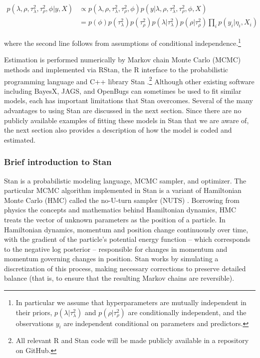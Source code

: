 \begin{align*}
p(\lambda, \rho, \tau^2_\lambda, \tau^2_\rho, \phi | y, X) & \propto p(\lambda, \rho, \tau^2_\lambda, \tau^2_\rho, \phi) p(y | \lambda, \rho, \tau^2_\lambda, \tau^2_\rho, \phi,  X)  \\
& = p(\phi) p(\tau^2_\lambda) p(\tau^2_\rho)  p(\lambda | \tau^2_\lambda) p(\rho | \tau^2_\rho) \prod_i p(y_i | \eta_i, X_i) 
\end{align*}

\noindent where the second line follows from assumptions of conditional independence.\footnote{In particular we assume that hyperparameters are mutually independent in their priors, $p(\lambda | \tau^2_\lambda)$ and $p(\rho | \tau^2_\rho)$ are conditionally independent, and the observations $y_i$ are independent conditional on parameters and predictors.}

Estimation is performed numerically by Markov chain Monte Carlo (MCMC) methods and implemented via RStan, the R interface to the probabilistic programming language and C++ library Stan .\footnote{All relevant R and Stan code will be made publicly available in a repository on GitHub.} Although other existing software including BayesX, JAGS, and OpenBugs can sometimes be used to fit similar models, each has important limitations that Stan overcomes. Several of the many advantages to using Stan are discussed in the next section. Since there are no publicly available examples of fitting these models in Stan that we are aware of, the next section also provides a description of how the model is coded and estimated. 

\subsubsection{Brief introduction to Stan}

Stan is a probabilistic modeling language, MCMC sampler, and optimizer. The particular MCMC algorithm implemented in Stan is a variant of Hamiltonian Monte Carlo (HMC) called the no-U-turn sampler (NUTS) . Borrowing from physics the concepts and mathematics behind Hamiltonian dynamics, HMC treats the vector of unknown parameters as the position of a particle. In Hamiltonian dynamics, momentum and position change continuously over time, with the gradient of the particle's potential energy function --  which corresponds to the negative log posterior -- responsible for changes in momentum and momentum governing changes in position. Stan works by simulating a discretization of this process, making necessary corrections to preserve detailed balance (that is, to ensure that the resulting Markov chains are reversible). 

